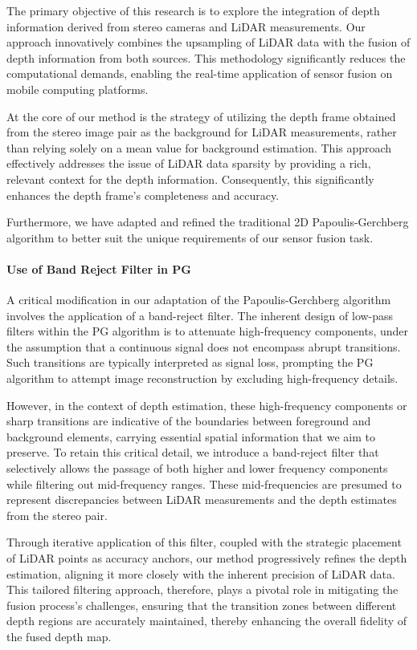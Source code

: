 \documentclass[conference]{IEEEtran}
\begin{document}
The primary objective of this research is to explore the integration of depth information derived from stereo cameras and LiDAR measurements. Our approach innovatively combines the upsampling of LiDAR data with the fusion of depth information from both sources. This methodology significantly reduces the computational demands, enabling the real-time application of sensor fusion on mobile computing platforms.

At the core of our method is the strategy of utilizing the depth frame obtained from the stereo image pair as the background for LiDAR measurements, rather than relying solely on a mean value for background estimation. This approach effectively addresses the issue of LiDAR data sparsity by providing a rich, relevant context for the depth information. Consequently, this significantly enhances the depth frame's completeness and accuracy.

Furthermore, we have adapted and refined the traditional 2D Papoulis-Gerchberg algorithm to better suit the unique requirements of our sensor fusion task.

\paragraph{Use of Band Reject Filter in PG}

A critical modification in our adaptation of the Papoulis-Gerchberg algorithm involves the application of a band-reject filter. The inherent design of low-pass filters within the PG algorithm is to attenuate high-frequency components, under the assumption that a continuous signal does not encompass abrupt transitions. Such transitions are typically interpreted as signal loss, prompting the PG algorithm to attempt image reconstruction by excluding high-frequency details.

However, in the context of depth estimation, these high-frequency components or sharp transitions are indicative of the boundaries between foreground and background elements, carrying essential spatial information that we aim to preserve. To retain this critical detail, we introduce a band-reject filter that selectively allows the passage of both higher and lower frequency components while filtering out mid-frequency ranges. These mid-frequencies are presumed to represent discrepancies between LiDAR measurements and the depth estimates from the stereo pair.

Through iterative application of this filter, coupled with the strategic placement of LiDAR points as accuracy anchors, our method progressively refines the depth estimation, aligning it more closely with the inherent precision of LiDAR data. This tailored filtering approach, therefore, plays a pivotal role in mitigating the fusion process's challenges, ensuring that the transition zones between different depth regions are accurately maintained, thereby enhancing the overall fidelity of the fused depth map.
\end{document}
